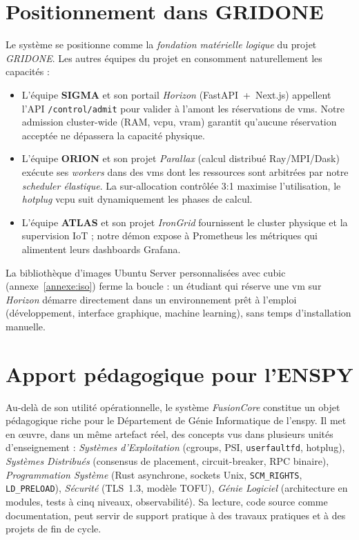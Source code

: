 \section*{Positionnement dans GRIDONE}

Le système se positionne comme la \emph{fondation matérielle logique} du projet \emph{GRIDONE}. Les autres équipes du projet en consomment naturellement les capacités :

\begin{itemize}[leftmargin=*]
    \item L'équipe \textbf{SIGMA} et son portail \emph{Horizon} (FastAPI~+~Next.js) appellent l'API \texttt{/control/admit} pour valider à l'amont les réservations de \acrshort{vm}s. Notre admission cluster-wide (RAM, \acrshort{vcpu}, \acrshort{vram}) garantit qu'aucune réservation acceptée ne dépassera la capacité physique.
    \item L'équipe \textbf{ORION} et son projet \emph{Parallax} (calcul distribué Ray/MPI/Dask) exécute ses \emph{workers} dans des \acrshort{vm}s dont les ressources sont arbitrées par notre \emph{scheduler élastique}. La sur-allocation contrôlée 3:1 maximise l'utilisation, le \emph{hotplug} \acrshort{vcpu} suit dynamiquement les phases de calcul.
    \item L'équipe \textbf{ATLAS} et son projet \emph{IronGrid} fournissent le cluster physique et la supervision IoT ; notre démon expose à Prometheus les métriques qui alimentent leurs dashboards Grafana.
\end{itemize}

La bibliothèque d'images Ubuntu Server personnalisées avec \acrshort{cubic} (annexe~\ref{annexe:iso}) ferme la boucle : un étudiant qui réserve une \acrshort{vm} sur \emph{Horizon} démarre directement dans un environnement prêt à l'emploi (développement, interface graphique, machine learning), sans temps d'installation manuelle.

\section*{Apport pédagogique pour l'ENSPY}

Au-delà de son utilité opérationnelle, le système \emph{FusionCore} constitue un objet pédagogique riche pour le Département de Génie Informatique de l'\acrshort{enspy}. Il met en œuvre, dans un même artefact réel, des concepts vus dans plusieurs unités d'enseignement : \emph{Systèmes d'Exploitation} (cgroups, PSI, \texttt{userfaultfd}, hotplug), \emph{Systèmes Distribués} (consensus de placement, circuit-breaker, RPC binaire), \emph{Programmation Système} (Rust asynchrone, sockets Unix, \texttt{SCM\_RIGHTS}, \texttt{LD\_PRELOAD}), \emph{Sécurité} (TLS~1.3, modèle TOFU), \emph{Génie Logiciel} (architecture en modules, tests à cinq niveaux, observabilité). Sa lecture, code source comme documentation, peut servir de support pratique à des travaux pratiques et à des projets de fin de cycle.

